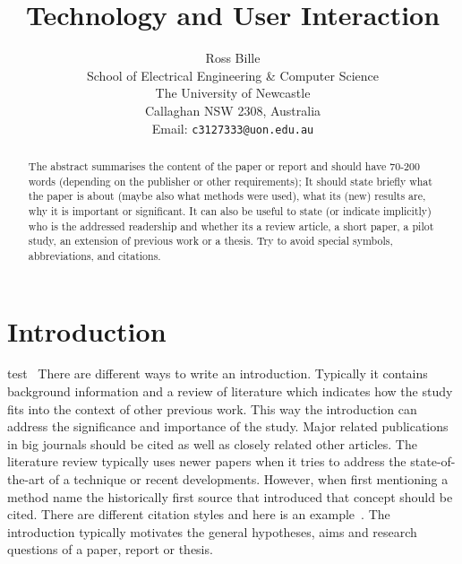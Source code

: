 \documentclass[a4,12pt]{article}
\begin{document}
%
\title{\bf Technology and User Interaction }
%
\author{Ross Bille\\
School of Electrical Engineering \& Computer Science\\
The University of Newcastle\\ Callaghan NSW 2308, Australia\\
Email: \texttt{c3127333@uon.edu.au} } 

\maketitle


\newpage
\begin{abstract}%
\noindent The abstract summarises the content of the paper or report and should have 70-200 words (depending on the publisher or other requirements); It
should state briefly what the paper is about (maybe also what
methods were used), what its (new) results are, why it is
important or significant. It can also be useful to state (or
indicate implicitly) who is the addressed readership and whether
its a review article, a short paper, a pilot study, an
extension of previous work or a thesis. Try to avoid special symbols, abbreviations, and citations.
\end{abstract}

\pagebreak

\tableofcontents

\pagebreak

\section{Introduction}
test~\citep{test}
There are different ways to write an introduction. Typically it
contains background information and a review of literature which
indicates how the study fits into the context of other previous
work. This way the introduction can  address the significance and importance of the study. Major related publications in big journals should be cited
as well as closely related other articles. The literature review typically uses newer papers when it tries to address the state-of-the-art of a technique or recent developments. However, when first mentioning a method name the historically first source that introduced that concept should be cited. There are different citation styles and here is an example~\citep{QuinlanChalupMiddletonACRA2003}. The introduction
typically motivates the general hypotheses, aims and research questions
of a paper, report or thesis.  
\end{document}
